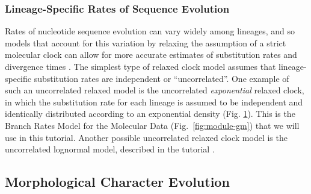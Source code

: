 \subsubsection{Lineage-Specific Rates of Sequence Evolution}\label{subsub:Intro-GTR-UExp}

Rates of nucleotide sequence evolution can vary widely among lineages, and so models that account for this variation by relaxing the assumption of a strict molecular clock \citep{Zuckerkandl1962} can allow for more accurate estimates of substitution rates and divergence times \citep{Drummond2006}.
The simplest type of relaxed clock model assumes that lineage-specific substitution rates are independent or ``uncorrelated''.
One example of such an uncorrelated relaxed model is the uncorrelated \textit{exponential} relaxed clock, in which the substitution rate for each lineage is assumed to be independent and identically distributed according to an exponential density (Fig. \ref{fig:uexp_gm}).
This is the \textsf{Branch Rates Model} for the \textsf{Molecular Data} (\IE Fig.\ \ref{fig:module-gm}) that we will use in this tutorial.
Another possible uncorrelated relaxed clock model is the uncorrelated lognormal model, described in the \href{https://github.com/revbayes/revbayes_tutorial/raw/master/tutorial_TeX/RB_Dating_Tutorial/RB_Dating_Tutorial.pdf}{} tutorial \citep[also see][]{Thorne2002,Heath2013}.
\begin{figure}[h!]
\label{fig:uexp_gm}
\end{figure}


\subsection{Morphological Character Evolution}\label{subsect:Intro-Morpho}

